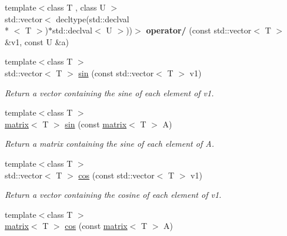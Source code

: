 \begin{DoxyCompactItemize}
\item 
\hypertarget{namespacekeycpp_a394f23f09cf122a8e8c20a7afd40f58e}{{\footnotesize template$<$class T , class U $>$ }\\std\-::vector$<$ decltype(std\-::declval\\*
$<$ T $>$)$\ast$std\-::declval$<$ U $>$))$>$ {\bfseries operator/} (const std\-::vector$<$ T $>$ \&v1, const U \&a)}\label{namespacekeycpp_a394f23f09cf122a8e8c20a7afd40f58e}

\item 
\hypertarget{namespacekeycpp_a1ebc4ddf6e567714f63f0dbb8a984745}{{\footnotesize template$<$class T $>$ }\\std\-::vector$<$ T $>$ \hyperlink{namespacekeycpp_a1ebc4ddf6e567714f63f0dbb8a984745}{sin} (const std\-::vector$<$ T $>$ v1)}\label{namespacekeycpp_a1ebc4ddf6e567714f63f0dbb8a984745}

\begin{DoxyCompactList}\small\item\em Return a vector containing the sine of each element of v1. \end{DoxyCompactList}\item 
\hypertarget{namespacekeycpp_a159a28c69282a740e381465a0e71bf23}{{\footnotesize template$<$class T $>$ }\\\hyperlink{classkeycpp_1_1matrix}{matrix}$<$ T $>$ \hyperlink{namespacekeycpp_a159a28c69282a740e381465a0e71bf23}{sin} (const \hyperlink{classkeycpp_1_1matrix}{matrix}$<$ T $>$ A)}\label{namespacekeycpp_a159a28c69282a740e381465a0e71bf23}

\begin{DoxyCompactList}\small\item\em Return a matrix containing the sine of each element of A. \end{DoxyCompactList}\item 
\hypertarget{namespacekeycpp_afaf5c65950c36d6a10e2fc42cae7b041}{{\footnotesize template$<$class T $>$ }\\std\-::vector$<$ T $>$ \hyperlink{namespacekeycpp_afaf5c65950c36d6a10e2fc42cae7b041}{cos} (const std\-::vector$<$ T $>$ v1)}\label{namespacekeycpp_afaf5c65950c36d6a10e2fc42cae7b041}

\begin{DoxyCompactList}\small\item\em Return a vector containing the cosine of each element of v1. \end{DoxyCompactList}\item 
\hypertarget{namespacekeycpp_a6d906ad1b0afbefd588c619cdb02530a}{{\footnotesize template$<$class T $>$ }\\\hyperlink{classkeycpp_1_1matrix}{matrix}$<$ T $>$ \hyperlink{namespacekeycpp_a6d906ad1b0afbefd588c619cdb02530a}{cos} (const \hyperlink{classkeycpp_1_1matrix}{matrix}$<$ T $>$ A)}\label{namespacekeycpp_a6d906ad1b0afbefd588c619cdb02530a}


\end{DoxyCompactItemize}
